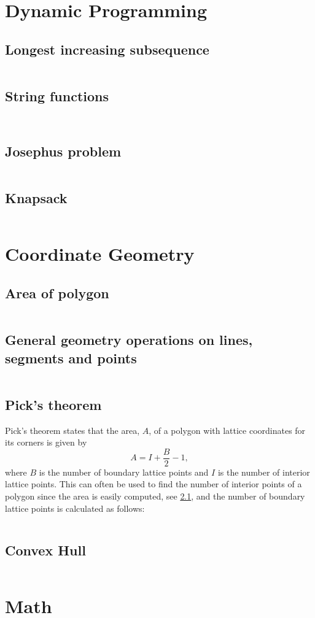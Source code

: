 \documentclass[8pt,a4paper,landscape,oneside]{amsart}
\newcommand{\codec}[1]{\inputminted[fontsize=\large,tabsize=2,baselinestretch=1]{cpp}{code/#1}}
\newcommand{\codep}[1]{\inputminted[fontsize=\large,tabsize=2,baselinestretch=1]{py}{code/#1}}
\begin{document}
\begin{multicols*}{2}
\begin{large}
\section{Dynamic Programming}
\subsection{Longest increasing subsequence}
\codep{lis.py}
\subsection{String functions}
\codep{stringmatching.py}
\codec{suffixarraylcp.cpp}
\subsection{Josephus problem}
\codep{josephus.py}
\subsection{Knapsack}
\codep{knapsack.py}
\section{Coordinate Geometry}
\subsection{Area of polygon}\label{sec: polyarea}
\codep{polygonArea.py}
\subsection{General geometry operations on lines, segments and points}
\codep{geometry.py}
\subsection{Pick's theorem}
Pick's theorem states that the area, $A$, of a polygon with lattice coordinates for its corners is given by $$A=I+\frac{B}{2}-1,$$ where $B$ is the number of boundary lattice points and $I$ is the number of interior lattice points. This can often be used to find the number of interior points of a polygon since the area is easily computed, see \ref{sec: polyarea}, and the number of boundary lattice points is calculated as follows:
\codep{boundarypoints.py}
\subsection{Convex Hull}
\codep{convexhull.py}
\section{Math}

\end{large}
\end{multicols*}
\end{document}
